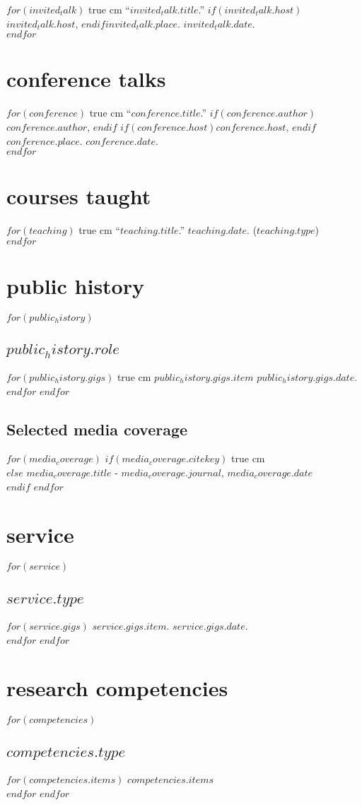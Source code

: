 \documentclass[11pt, letter]{article}
\def\ind{\hangindent=1 true cm\hangafter=1 \noindent}
\begin{document}
$for(invited_talk)$
\ind ``$invited_talk.title$.'' $if(invited_talk.host)$$invited_talk.host$, $endif$$invited_talk.place$. $invited_talk.date$.\\[.15cm]
$endfor$


\section{conference talks}

$for(conference)$
\ind ``$conference.title$.''
$if(conference.author)$$conference.author$, $endif$
$if(conference.host)$$conference.host$, $endif$
$conference.place$.
$conference.date$.\\[.15cm]
$endfor$

\section{courses taught}

$for(teaching)$
\ind ``$teaching.title$.'' $teaching.date$. ($teaching.type$)\\[.15cm]
$endfor$


\section{public history}

$for(public_history)$
\subsection{$public_history.role$}
$for(public_history.gigs)$
\ind $public_history.gigs.item$ $public_history.gigs.date$.\\[.15cm]
$endfor$
$endfor$
\subsection{Selected media coverage}

$for(media_coverage)$
$if(media_coverage.citekey)$
\ind {}\\
$else$
$media_coverage.title$ -  \textit{$media_coverage.journal$}, $media_coverage.date$\\[.15cm]
$endif$
$endfor$


\section{service}
$for(service)$
\subsection{$service.type$}
$for(service.gigs)$
$service.gigs.item$. $service.gigs.date$.\\[.15cm]
$endfor$
$endfor$


\section{research competencies}
$for(competencies)$
\subsection{\itshape $competencies.type$}
$for(competencies.items)$
$competencies.items$\\[.15cm]
$endfor$
$endfor$
\end{document}
